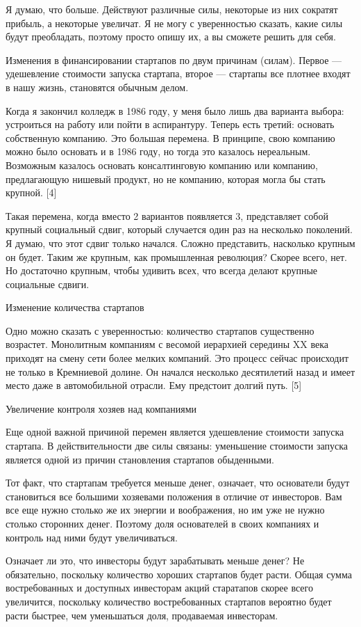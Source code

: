 \documentclass[ebook,12pt,oneside,openany]{memoir}
\begin{document}
Я думаю, что больше. Действуют различные силы, некоторые из них
сократят прибыль, а некоторые увеличат. Я не могу с уверенностью
сказать, какие силы будут преобладать, поэтому просто опишу их, а вы
сможете решить для себя.

Изменения в финансировании стартапов по двум причинам (силам). Первое
— удешевление стоимости запуска стартапа, второе — стартапы все
плотнее входят в нашу жизнь, становятся обычным делом.

Когда я закончил колледж в 1986 году, у меня было лишь два варианта
выбора: устроиться на работу или пойти в аспирантуру. Теперь есть
третий: основать собственную компанию. Это большая перемена. В
принципе, свою компанию можно было основать и в 1986 году, но тогда
это казалось нереальным. Возможным казалось основать консалтинговую
компанию или компанию, предлагающую нишевый продукт, но не компанию,
которая могла бы стать крупной. [4]

Такая перемена, когда вместо 2 вариантов появляется 3, представляет
собой крупный социальный сдвиг, который случается один раз на
несколько поколений. Я думаю, что этот сдвиг только начался. Сложно
представить, насколько крупным он будет. Таким же крупным, как
промышленная революция? Скорее всего, нет. Но достаточно крупным,
чтобы удивить всех, что всегда делают крупные социальные сдвиги.

Изменение количества стартапов

Одно можно сказать с уверенностью: количество стартапов существенно
возрастет. Монолитным компаниям с весомой иерархией середины XX века
приходят на смену сети более мелких компаний. Это процесс сейчас
происходит не только в Кремниевой долине. Он начался несколько
десятилетий назад и имеет место даже в автомобильной отрасли. Ему
предстоит долгий путь. [5]

Увеличение контроля хозяев над компаниями

Еще одной важной причиной перемен является удешевление стоимости
запуска стартапа. В действительности две силы связаны: уменьшение
стоимости запуска является одной из причин становления стартапов
обыденными.

Тот факт, что стартапам требуется меньше денег, означает, что
основатели будут становиться все большими хозяевами положения в
отличие от инвесторов. Вам все еще нужно столько же их энергии и
воображения, но им уже не нужно столько сторонних денег. Поэтому доля
основателей в своих компаниях и контроль над ними будут увеличиваться.

Означает ли это, что инвесторы будут зарабатывать меньше денег? Не
обязательно, поскольку количество хороших стартапов будет расти. Общая
сумма востребованных и доступных инвесторам акций старатапов скорее
всего увеличится, поскольку количество востребованных стартапов
вероятно будет расти быстрее, чем уменьшаться доля, продаваемая
инвесторам.
\end{document}
